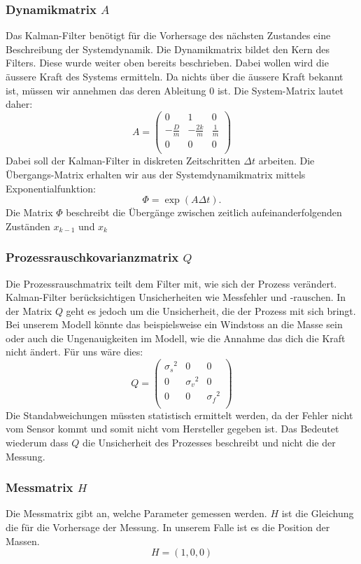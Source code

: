 \subsubsection*{Dynamikmatrix $A$}
Das Kalman-Filter benötigt für die Vorhersage des nächsten Zustandes eine Beschreibung der Systemdynamik.
Die Dynamikmatrix bildet den Kern des Filters. Diese wurde weiter oben bereits beschrieben. 
Dabei wollen wird die äussere Kraft des Systems ermitteln.
Da nichts über die äussere Kraft bekannt ist, müssen wir annehmen das deren Ableitung 0 ist. 
Die System-Matrix lautet daher:
\[ 
A = \left(
 \begin{array}{ccc} 	
0 & 1& 0 \\
- \frac{D}{m} &-\frac{2k}{m} & \frac{1} {m}\\
0 & 0& 0\\ 
\end{array}\right)  
 \]
Dabei soll der Kalman-Filter in diskreten Zeitschritten $\Delta t$ arbeiten. 
Die Übergangs-Matrix erhalten wir aus der Systemdynamikmatrix mittels Exponentialfunktion: 
\[\Phi = \exp(A\Delta t). \]
Die Matrix $\Phi$ beschreibt die Übergänge zwischen zeitlich aufeinanderfolgenden Zuständen $x_{k-1}$ und $x_{k}$

\subsubsection*{Prozessrauschkovarianzmatrix $Q$}
Die Prozessrauschmatrix teilt dem Filter mit, wie sich der Prozess verändert. 
Kalman-Filter berücksichtigen Unsicherheiten wie Messfehler und -rauschen. 
In der Matrix $Q$ geht es jedoch um die Unsicherheit, die der Prozess mit sich bringt. 
Bei unserem Modell könnte das beispielsweise ein Windstoss an die Masse sein oder auch die Ungenauigkeiten im Modell, wie die Annahme das dich die Kraft nicht ändert.
Für uns wäre dies:
\[ 
Q = \left(
 \begin{array}{ccc} 	
{\sigma_s }^2& 0& 0 \\ 
0 & {\sigma_v }^2& 0\\ 
0 & 0& {\sigma_f }^2\\
\end{array}\right)  
 \]
Die Standabweichungen müssten statistisch ermittelt werden, da der Fehler nicht vom Sensor kommt und somit nicht vom Hersteller gegeben ist. 
Das Bedeutet wiederum dass $Q$ die Unsicherheit des Prozesses beschreibt und nicht die der Messung.

\subsubsection*{Messmatrix $H$}
Die Messmatrix gibt an, welche Parameter gemessen werden. 
$H$ ist die Gleichung die für die Vorhersage der Messung.
In unserem Falle ist es die Position der Massen. 
\[ 
H = (1, 0, 0) 
\]

